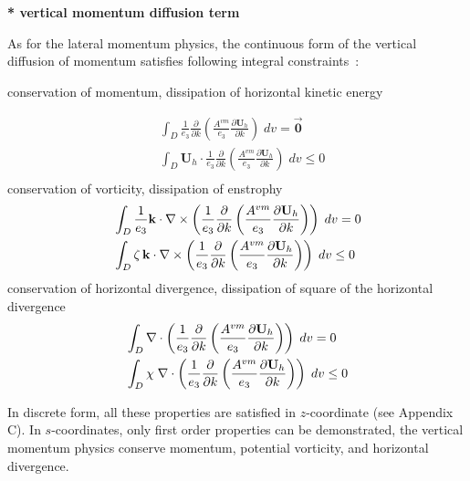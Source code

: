 \documentclass[../main/NEMO_manual]{subfiles}
\begin{document}
\textbf{* vertical momentum diffusion term}

As for the lateral momentum physics, the continuous form of the vertical diffusion of
momentum satisfies following integral constraints~:

conservation of momentum, dissipation of horizontal kinetic energy

\[
  \begin{aligned}
    & \int_D {\frac{1}{e_3 }}  \frac{\partial }{\partial k}\left( \frac{A^{vm}}{e_3 }\frac{\partial {\textbf{U}}_h }{\partial k} \right) \;dv = \overrightarrow{\textbf{0}} \\
    & \int_D \textbf{U}_h \cdot \frac{1}{e_3} \frac{\partial}{\partial k} \left( {\frac{A^{vm}}{e_3 }}{\frac{\partial \textbf{U}_h }{\partial k}} \right) \;dv \leq 0 \\
  \end{aligned}
\]
conservation of vorticity, dissipation of enstrophy
\[
  \begin{aligned}
    & \int_D {\frac{1}{e_3 }{\rm {\bf k}}\cdot \nabla \times \left( {\frac{1}{e_3
          }\frac{\partial }{\partial k}\left( {\frac{A^{vm}}{e_3 }\frac{\partial {\rm
                  {\bf U}}_h }{\partial k}} \right)} \right)\;dv} =0 \\
    & \int_D {\zeta \,{\rm {\bf k}}\cdot \nabla \times \left( {\frac{1}{e_3
          }\frac{\partial }{\partial k}\left( {\frac{A^{vm}}{e_3 }\frac{\partial {\rm
                  {\bf U}}_h }{\partial k}} \right)} \right)\;dv} \leq 0 \\
  \end{aligned}
\]
conservation of horizontal divergence, dissipation of square of the horizontal divergence
\[
  \begin{aligned}
    &\int_D {\nabla \cdot \left( {\frac{1}{e_3 }\frac{\partial }{\partial
            k}\left( {\frac{A^{vm}}{e_3 }\frac{\partial {\rm {\bf U}}_h }{\partial k}}
          \right)} \right)\;dv} =0 \\
    & \int_D {\chi \;\nabla \cdot \left( {\frac{1}{e_3 }\frac{\partial }{\partial
            k}\left( {\frac{A^{vm}}{e_3 }\frac{\partial {\rm {\bf U}}_h }{\partial k}}
          \right)} \right)\;dv} \leq 0 \\
  \end{aligned}
\]

In discrete form, all these properties are satisfied in $z$-coordinate (see Appendix C).
In $s$-coordinates, only first order properties can be demonstrated,
\ie the vertical momentum physics conserve momentum, potential vorticity, and horizontal divergence.
\end{document}
